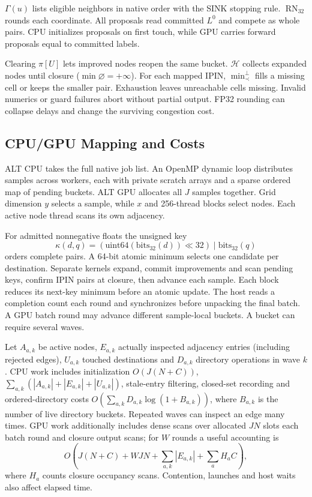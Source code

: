 $\Gamma(u)$ lists eligible neighbors in native order with the SINK stopping rule. $\operatorname{RN}_{32}$ rounds each coordinate. All proposals read committed $L^0$ and compete as whole pairs. CPU initializes proposals on first touch, while GPU carries forward proposals equal to committed labels.

Clearing $\pi[U]$ lets improved nodes reopen the same bucket. $\mathcal H$ collects expanded nodes until closure ($\min\varnothing=+\infty$). For each mapped IPIN, $\min_{\prec}^{\bot}$ fills a missing cell or keeps the smaller pair. Exhaustion leaves unreachable cells missing. Invalid numerics or guard failures abort without partial output. FP32 rounding can collapse delays and change the surviving congestion cost.

\subsection{CPU/GPU Mapping and Costs}
ALT CPU takes the full native job list. An OpenMP dynamic loop distributes samples across workers, each with private scratch arrays and a sparse ordered map of pending buckets. ALT GPU allocates all $J$ samples together. Grid dimension $y$ selects a sample, while $x$ and 256-thread blocks select nodes. Each active node thread scans its own adjacency.

For admitted nonnegative floats the unsigned key
\begin{equation}
 \kappa(d,q)=(\mathrm{uint64}(\mathrm{bits}_{32}(d))\ll32)
          \mathbin{|}\mathrm{bits}_{32}(q)
\end{equation}
orders complete pairs. A 64-bit atomic minimum selects one candidate per destination. Separate kernels expand, commit improvements and scan pending keys, confirm IPIN pairs at closure, then advance each sample. Each block reduces its next-key minimum before an atomic update. The host reads a completion count each round and synchronizes before unpacking the final batch. A GPU batch round may advance different sample-local buckets. A bucket can require several waves.

Let $A_{a,k}$ be active nodes, $E_{a,k}$ actually inspected adjacency entries (including rejected edges), $U_{a,k}$ touched destinations and $D_{a,k}$ directory operations in wave $k$. CPU work includes initialization $O(J(N+C))$, $\sum_{a,k}(|A_{a,k}|+|E_{a,k}|+|U_{a,k}|)$, stale-entry filtering, closed-set recording and ordered-directory costs $O(\sum_{a,k}D_{a,k}\log(1+B_{a,k}))$, where $B_{a,k}$ is the number of live directory buckets. Repeated waves can inspect an edge many times. GPU work additionally includes dense scans over allocated $JN$ slots each batch round and closure output scans; for $W$ rounds a useful accounting is
\begin{equation}
 O\!\left(J(N+C)+WJN+\sum_{a,k}|E_{a,k}|+\sum_a H_a C\right),
\end{equation}
where $H_a$ counts closure occupancy scans. Contention, launches and host waits also affect elapsed time.

